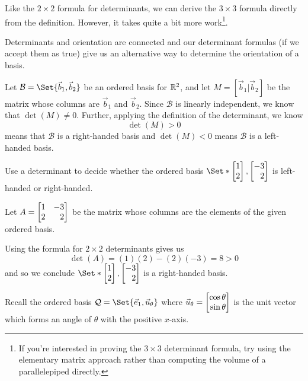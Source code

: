 Like the $2\times 2$ formula for determinants, we can derive the $3\times 3$ formula directly from the definition. However, it takes
quite a bit more work\footnote{ If you're interested in proving the $3\times 3$ determinant formula, try using the elementary matrix
approach rather than computing the volume of a parallelepiped directly.}.


Determinants and orientation are connected and our determinant formulas (if we accept them as true) give us an
alternative way to determine the orientation of a basis.

Let $\mathcal B=\Set{\vec b_1,\vec b_2}$ be an ordered basis for $\mathbb{R}^2$, and let $M=[\vec b_1|\vec b_2]$ be the matrix whose
columns are $\vec b_1$ and $\vec b_2$. Since $\mathcal B$ is linearly independent, we know that $\det(M)\neq 0$.
Further, applying the definition of the determinant, we know
\[
	\det(M)>0
\]
means that $\mathcal B$ is a right-handed basis and $\det(M)<0$ means $\mathcal B$ is a left-handed basis.

\begin{example}
	Use a determinant to decide whether the ordered basis $\Set*{\mat{1\\2},\mat{-3\\2}}$ is left-handed or right-handed.

	Let $A = \mat{1 & -3 \\ 2 & 2}$ be the matrix whose columns are the elements of the given ordered basis.
	
	Using the formula for $2 \times 2$ determinants gives us
	\[
		\det(A) = (1)(2) - (2)(-3) = 8 > 0
	\]
	and so we conclude $\Set*{\mat{1\\2},\mat{-3\\2}}$ is a right-handed basis.
\end{example}

\medskip
Recall the ordered basis $\mathcal Q=\Set{\xhat, \vec u_{\theta}}$ where $\vec u_\theta = \mat{\cos\theta\\\sin\theta}$ is the
unit vector which forms an angle of $\theta$ with the positive $x$-axis.

